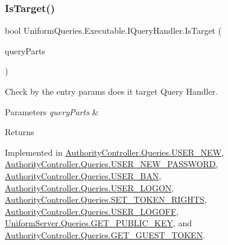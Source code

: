 \mbox{\label{interface_uniform_queries_1_1_executable_1_1_i_query_handler_a0f43184bf3e306a7cbebc39098f044ee}} 
\subsubsection{\texorpdfstring{Is\+Target()}{IsTarget()}}
{\footnotesize\ttfamily bool Uniform\+Queries.\+Executable.\+I\+Query\+Handler.\+Is\+Target (\begin{DoxyParamCaption}\item[{\mbox{\hyperlink{struct_uniform_queries_1_1_query_part}{Query\+Part}} \mbox{[}$\,$\mbox{]}}]{query\+Parts }\end{DoxyParamCaption})}



Check by the entry params does it target Query Handler. 


\begin{DoxyParams}{Parameters}
{\em query\+Parts} & \\
\hline
\end{DoxyParams}
\begin{DoxyReturn}{Returns}

\end{DoxyReturn}


Implemented in \mbox{\hyperlink{class_authority_controller_1_1_queries_1_1_u_s_e_r___n_e_w_a6e26596b5a5ecc3d07591766b5d325ec}{Authority\+Controller.\+Queries.\+U\+S\+E\+R\+\_\+\+N\+EW}}, \mbox{\hyperlink{class_authority_controller_1_1_queries_1_1_u_s_e_r___n_e_w___p_a_s_s_w_o_r_d_a48ff6874453caf45973ad386bfe5b513}{Authority\+Controller.\+Queries.\+U\+S\+E\+R\+\_\+\+N\+E\+W\+\_\+\+P\+A\+S\+S\+W\+O\+RD}}, \mbox{\hyperlink{class_authority_controller_1_1_queries_1_1_u_s_e_r___b_a_n_a29c898b411adc3a0edbed31cf90e007b}{Authority\+Controller.\+Queries.\+U\+S\+E\+R\+\_\+\+B\+AN}}, \mbox{\hyperlink{class_authority_controller_1_1_queries_1_1_u_s_e_r___l_o_g_o_n_a53261c6c60dc1a2324a67adf19f7547a}{Authority\+Controller.\+Queries.\+U\+S\+E\+R\+\_\+\+L\+O\+G\+ON}}, \mbox{\hyperlink{class_authority_controller_1_1_queries_1_1_s_e_t___t_o_k_e_n___r_i_g_h_t_s_a605feed66d357dc93ccc825068d83c96}{Authority\+Controller.\+Queries.\+S\+E\+T\+\_\+\+T\+O\+K\+E\+N\+\_\+\+R\+I\+G\+H\+TS}}, \mbox{\hyperlink{class_authority_controller_1_1_queries_1_1_u_s_e_r___l_o_g_o_f_f_afbfa78117d68ab2bd2728c78d31c1c58}{Authority\+Controller.\+Queries.\+U\+S\+E\+R\+\_\+\+L\+O\+G\+O\+FF}}, \mbox{\hyperlink{class_uniform_server_1_1_queries_1_1_g_e_t___p_u_b_l_i_c___k_e_y_ae27d462fe9ccbbf22ac03c9ead9cbe8f}{Uniform\+Server.\+Queries.\+G\+E\+T\+\_\+\+P\+U\+B\+L\+I\+C\+\_\+\+K\+EY}}, and \mbox{\hyperlink{class_authority_controller_1_1_queries_1_1_g_e_t___g_u_e_s_t___t_o_k_e_n_a5606c5797e0a684a6bfbbd851f186268}{Authority\+Controller.\+Queries.\+G\+E\+T\+\_\+\+G\+U\+E\+S\+T\+\_\+\+T\+O\+K\+EN}}.



